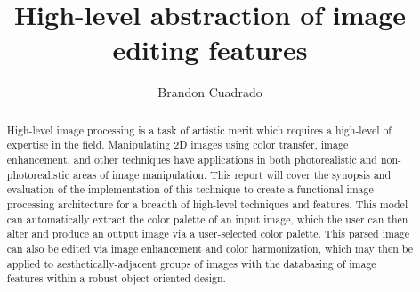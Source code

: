 \documentclass[sigchi]{acmart}
\begin{document}
%
\title{High-level abstraction of image editing features}

%
\author{Brandon Cuadrado}

%
\renewcommand{\shortauthors}{B. Cuadrado}

%
\begin{abstract}
High-level image processing is a task of artistic merit which requires a high-level of expertise in the field. Manipulating 2D images using color transfer, image enhancement, and other techniques have applications in both photorealistic and non-photorealistic areas of image manipulation. This report will cover the synopsis and evaluation of the implementation of this technique to create a functional image processing architecture for a breadth of high-level techniques and features. This model can automatically extract the color palette of an input image, which the user can then alter and produce an output image via a user-selected color palette. This parsed image can also be edited via image enhancement and color harmonization, which may then be applied to aesthetically-adjacent groups of images with the databasing of image features within a robust object-oriented design.
\end{abstract}

%
%

%
\end{document}
